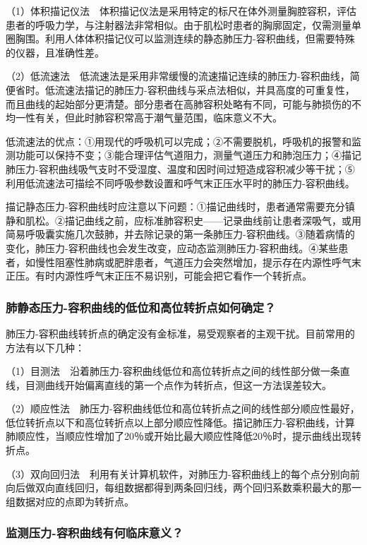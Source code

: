 （1）体积描记仪法　体积描记仪法是采用特定的标尺在体外测量胸腔容积，评估患者的呼吸力学，与注射器法非常相似。由于肌松时患者的胸廓固定，仅需测量单圈胸围。利用人体体积描记仪可以监测连续的静态肺压力-容积曲线，但需要特殊的仪器，且准确性差。

（2）低流速法　低流速法是采用非常缓慢的流速描记连续的肺压力-容积曲线，简便省时。低流速法描记的肺压力-容积曲线与采点法相似，并具高度的可重复性，而且曲线的起始部分更清楚。部分患者在高肺容积处略有不同，可能与肺损伤的不均一性有关，但此时肺容积常高于潮气量范围，临床意义不大。

低流速法的优点：①用现代的呼吸机可以完成；②不需要脱机，呼吸机的报警和监测功能可以保持不变；③能合理评估气道阻力，测量气道压力和肺泡压力；④描记肺压力-容积曲线吸气支时不受湿度、温度和因时间过短造成容积减少等干扰；⑤利用低流速法可描绘不同呼吸参数设置和呼气末正压水平时的肺压力-容积曲线。

描记静态压力-容积曲线时应注意以下问题：①描记曲线时，患者通常需要充分镇静和肌松。②描记曲线之前，应标准肺容积史------记录曲线前让患者深吸气，或用简易呼吸囊实施几次鼓肺，并去除记录的第一条肺压力-容积曲线。③随着病情的变化，肺压力-容积曲线也会发生改变，应动态监测肺压力-容积曲线。④某些患者，如慢性阻塞性肺病或肥胖患者，气道压力会突然增加，提示存在内源性呼气末正压。有时内源性呼气末正压不易识别，可能会把它看作一个转折点。

\subsubsection{肺静态压力-容积曲线的低位和高位转折点如何确定？}

肺压力-容积曲线转折点的确定没有金标准，易受观察者的主观干扰。目前常用的方法有以下几种：

（1）目测法　沿着肺压力-容积曲线低位和高位转折点之间的线性部分做一条直线，目测曲线开始偏离直线的第一个点作为转折点，但这一方法误差较大。

（2）顺应性法　肺压力-容积曲线低位和高位转折点之间的线性部分顺应性最好，低位转折点以下和高位转折点以上部分顺应性降低。描记肺压力-容积曲线，计算肺顺应性，当顺应性增加了20％或开始比最大顺应性降低20％时，提示曲线出现转折点。

（3）双向回归法　利用有关计算机软件，对肺压力-容积曲线上的每个点分别向前向后做双向直线回归，每组数据都得到两条回归线，两个回归系数乘积最大的那一组数据对应的点即为转折点。

\subsubsection{监测压力-容积曲线有何临床意义？}

